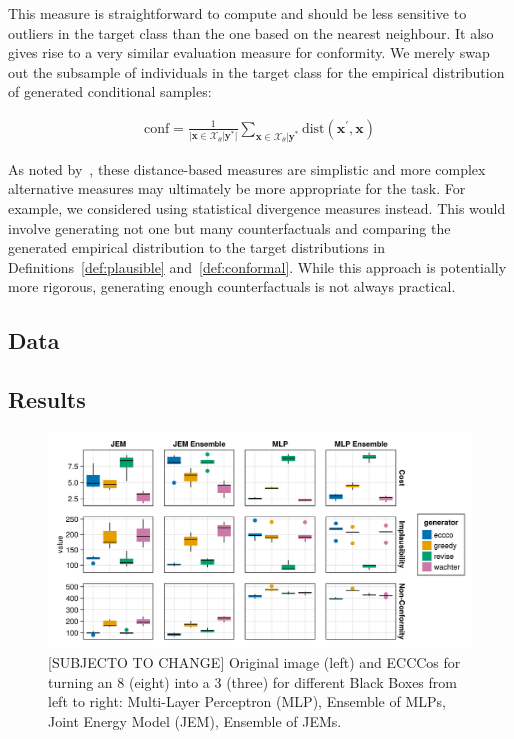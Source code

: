 \documentclass{article}
\begin{document}
This measure is straightforward to compute and should be less sensitive to outliers in the target class than the one based on the nearest neighbour. It also gives rise to a very similar evaluation measure for conformity. We merely swap out the subsample of individuals in the target class for the empirical distribution of generated conditional samples:

\begin{equation}\label{eq:conf}
  \begin{aligned}
    \text{conf} = \frac{1}{\lvert\mathbf{x} \in \mathcal{X}_{\theta}|\mathbf{y}^*\rvert} \sum_{\mathbf{x} \in \mathcal{X}_{\theta}|\mathbf{y}^*} \text{dist}(\mathbf{x}^{\prime},\mathbf{x})
  \end{aligned}
\end{equation}

As noted by~\citet{guidotti2022counterfactual}, these distance-based measures are simplistic and more complex alternative measures may ultimately be more appropriate for the task. For example, we considered using statistical divergence measures instead. This would involve generating not one but many counterfactuals and comparing the generated empirical distribution to the target distributions in Definitions~\ref{def:plausible} and~\ref{def:conformal}. While this approach is potentially more rigorous, generating enough counterfactuals is not always practical. 

\subsection{Data}

\subsection{Results}

\begin{figure}
  \includegraphics[width=\textwidth]{../artifacts/results/images/mnist_benchmark.png}
  \caption{[SUBJECTO TO CHANGE] Original image (left) and ECCCos for turning an 8 (eight) into a 3 (three) for different Black Boxes from left to right: Multi-Layer Perceptron (MLP), Ensemble of MLPs, Joint Energy Model (JEM), Ensemble of JEMs.}\label{fig:mnist-benchmark}
\end{figure}
\end{document}
